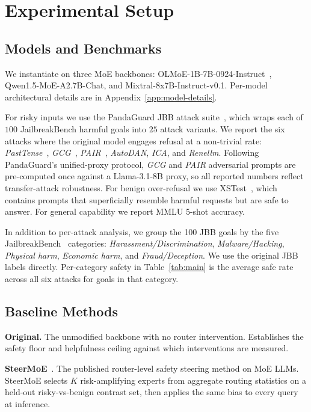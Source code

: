\section{Experimental Setup}
\label{sec:setup}

\subsection{Models and Benchmarks}
\label{sec:setup-data}
We instantiate \name on three MoE backbones: OLMoE-1B-7B-0924-Instruct~\cite{muennighoff2025olmoe}, Qwen1.5-MoE-A2.7B-Chat, and Mixtral-8x7B-Instruct-v0.1. Per-model architectural details are in Appendix~\ref{app:model-details}.

For risky inputs we use the PandaGuard JBB attack suite~\cite{pandaguard}, which wraps each of $100$ JailbreakBench harmful goals into $25$ attack variants. We report the six attacks where the original model engages refusal at a non-trivial rate: \emph{PastTense}~\cite{andriushchenko2024past}, \emph{GCG}~\cite{zou2023gcg}, \emph{PAIR}~\cite{chao2023pair}, \emph{AutoDAN}, \emph{ICA}, and \emph{Renellm}. Following PandaGuard's unified-proxy protocol, \emph{GCG} and \emph{PAIR} adversarial prompts are pre-computed once against a Llama-3.1-8B proxy, so all reported numbers reflect transfer-attack robustness. For benign over-refusal we use XSTest~\cite{rottger2024xstest}, which contains prompts that superficially resemble harmful requests but are safe to answer. For general capability we report MMLU 5-shot accuracy.

In addition to per-attack analysis, we group the 100 JBB goals by the five JailbreakBench~\cite{jailbreakbench} categories: \emph{Harassment/Discrimination}, \emph{Malware/Hacking}, \emph{Physical harm}, \emph{Economic harm}, and \emph{Fraud/Deception}. We use the original JBB labels directly. Per-category safety in Table~\ref{tab:main} is the average safe rate across all six attacks for goals in that category.

\subsection{Baseline Methods}

\noindent\textbf{Original.} The unmodified backbone with no router intervention. Establishes the safety floor and helpfulness ceiling against which interventions are measured.

\noindent\textbf{SteerMoE}~\cite{fayyaz2025steermoe}. The published router-level safety steering method on MoE LLMs. SteerMoE selects $K$ risk-amplifying experts from aggregate routing statistics on a held-out risky-vs-benign contrast set, then applies the same bias to every query at inference.

